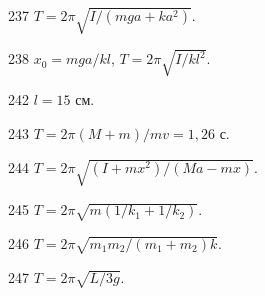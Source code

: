 \begin{Answer}{237}
$T = 2 \pi \sqrt{I/(mga + ka^2)}$.
\end{Answer}
\begin{Answer}{238}
$x_0 = mga/kl$, $T = 2 \pi \sqrt{I/kl^2}$.
\end{Answer}
\begin{Answer}{242}
$l = 15$ см.
\end{Answer}
\begin{Answer}{243}
$T = 2 \pi (M+m) / mv = 1,26$ с.
\end{Answer}
\begin{Answer}{244}
$T = 2 \pi \sqrt{(I+mx^2)/(Ma - mx)}$.
\end{Answer}
\begin{Answer}{245}
$T = 2 \pi \sqrt{m(1/k_1 + 1/k_2)}$.
\end{Answer}
\begin{Answer}{246}
$T = 2 \pi \sqrt{m_1m_2/(m_1 + m_2)k}$.
\end{Answer}
\begin{Answer}{247}
$T = 2 \pi \sqrt{L/3g}$.
\end{Answer}
